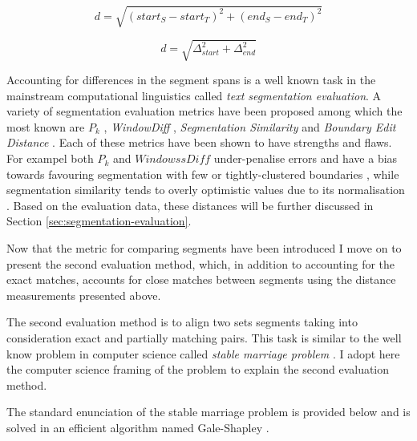     \begin{equation} \label{eq:distance}
    d= \sqrt{(start_S - start_T)^{2}+(end_S-end_T)^{2}}
    \end{equation}
    
    \begin{equation} \label{eq:distance-simpliefied}
    d= \sqrt{\varDelta_{start} ^{2}+\varDelta_{end}^{2}}
    \end{equation}
    
    Accounting for differences in the segment spans is a well known task in the mainstream computational linguistics called \textit{text segmentation evaluation}. A variety of segmentation evaluation metrics have been proposed among which the most known are $P_k$ \citep[198--200]{beeferman1999statistical}, \textit{WindowDiff} \citep[10]{pevzner2002critique}, \textit{Segmentation Similarity} \citep[154-156]{fournier2012segmentation} and \textit{Boundary Edit Distance} \citep{fournier2013evaluating}. Each of these metrics have been shown to have strengths and flaws. For exampel both $P_k$ and $WindowssDiff$ under-penalise errors \citep{lamprier2007evaluation} and have a bias towards favouring segmentation with few or tightly-clustered boundaries \citep{niekrasz2010unbiased}, while segmentation similarity tends to overly optimistic values due to its normalisation \citep{fournier2013evaluating}. Based on the evaluation data, these distances will be further discussed in Section \ref{sec:segmentation-evaluation}. 
    

    Now that the metric for comparing segments have been introduced I move on to present the second evaluation method, which, in addition to accounting for the exact matches, accounts for close matches between segments using the distance measurements presented above. 
    
    The second evaluation method is to align two sets segments taking into consideration exact and partially matching pairs. This task is similar to the well know problem in computer science called \textit{stable marriage problem} \citep{Gusfield1989}. I adopt here the computer science framing of the problem to explain the second evaluation method.
    
    The standard enunciation of the stable marriage problem is provided below and is solved in an efficient algorithm named Gale-Shapley \citep{Gale1962}.
    
